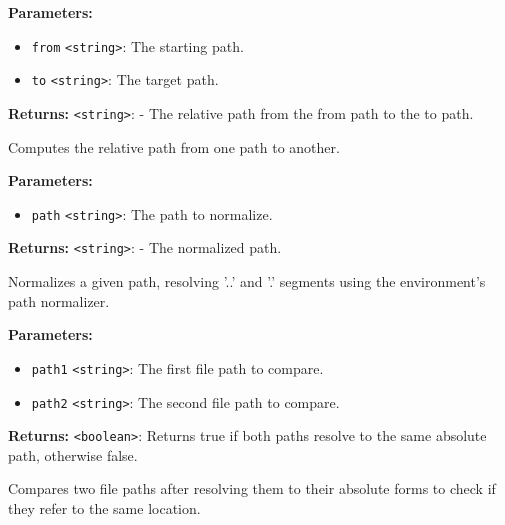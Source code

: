 \documentclass[12pt,a4paper]{article}
\begin{document}
\noindent \textbf{Parameters:}
\begin{itemize}
  \item \texttt{from} \texttt{<string>}: The starting path.
  \item \texttt{to} \texttt{<string>}: The target path.
\end{itemize}

\noindent \textbf{Returns:} \texttt{<string>}: - The relative path from the \textasciigrave{}from\textasciigrave{} path to the \textasciigrave{}to\textasciigrave{} path.

\noindent Computes the relative path from one path to another.

\vspace{5mm}
\noindent {}


\noindent \textbf{Parameters:}
\begin{itemize}
  \item \texttt{path} \texttt{<string>}: The path to normalize.
\end{itemize}

\noindent \textbf{Returns:} \texttt{<string>}: - The normalized path.

\noindent Normalizes a given path, resolving '..' and '.' segments using the environment's path normalizer.

\vspace{5mm}
\noindent {}


\noindent \textbf{Parameters:}
\begin{itemize}
  \item \texttt{path1} \texttt{<string>}: The first file path to compare.
  \item \texttt{path2} \texttt{<string>}: The second file path to compare.
\end{itemize}

\noindent \textbf{Returns:} \texttt{<boolean>}: Returns true if both paths resolve to the same absolute path, otherwise false.

\noindent Compares two file paths after resolving them to their absolute forms to check if they refer to the same location.

\vspace{5mm}
\noindent {}
\end{document}
